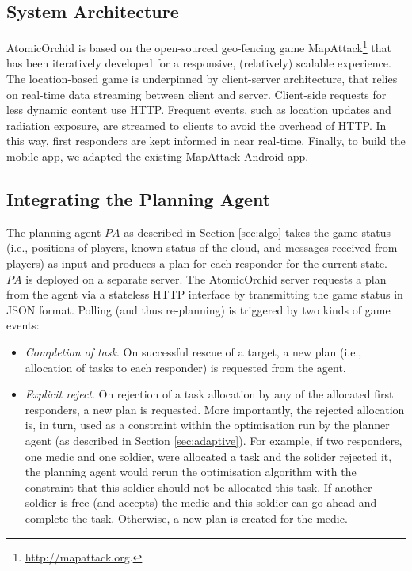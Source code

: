 \subsection{System Architecture}
\noindent AtomicOrchid is based on the open-sourced geo-fencing game MapAttack\footnote{\url{http://mapattack.org}.} that has been iteratively developed for a responsive, (relatively) scalable experience.  The location-based game is underpinned by client-server architecture, that relies on real-time data streaming between client and server. Client-side requests for less dynamic content use HTTP. Frequent events, such as location updates and radiation exposure, are streamed to clients to avoid the overhead of HTTP. In this way, first responders are kept informed in near real-time. Finally,  to build the mobile app, we adapted the existing MapAttack Android app.


\subsection{Integrating the Planning Agent}
\noindent The planning agent $PA$ as described in Section \ref{sec:algo} takes the game status (i.e., positions of players, known status of the cloud, and messages received from players) as input and produces a plan for each responder  for the current state. $PA$ is deployed on a separate server. The AtomicOrchid server requests a plan from the agent via a stateless HTTP interface by transmitting the game status in JSON format. Polling (and thus re-planning) is triggered by two kinds of game events:
\begin{itemize}
\item \textit{Completion of task}. On successful rescue of a target, a new plan (i.e., allocation of tasks to each responder) is requested from the agent.
\item \textit{Explicit reject}. On rejection of a task allocation by any of the allocated first responders, a new plan is requested.  More importantly, the rejected allocation is, in turn, used as a constraint within the optimisation run by the planner agent (as described in Section \ref{sec:adaptive}). For example, if two responders, one medic and one soldier, were allocated a task and the solider rejected it, the planning agent would rerun the optimisation algorithm with the constraint that this soldier should not be allocated this task. If another soldier is free (and accepts) the medic and this soldier can go ahead and complete the task. Otherwise, a new plan is created for the medic.
\end{itemize} 

